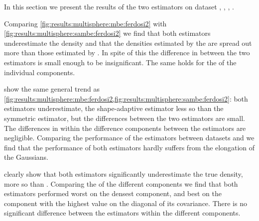 

















\oldStuff

	In this section we present the results of the two estimators on dataset \ferdosiTwo, \baakmanTwo, \ferdosiThree, \baakmanThree.

	Comparing \cref{fig:results:multisphere:mbe:ferdosi2} with \cref{fig:results:multisphere:sambe:ferdosi2} we find that both estimators underestimate the density and that the densities estimated by the \sambe are spread out more than those estimated by \mbe. In spite of this the difference in \mse between the two estimators is small enough to be insignificant. 
	The same holds for the \mse of the individual components.

	 show the same general trend as \cref{fig:results:multisphere:mbe:ferdosi2,fig:results:multisphere:sambe:ferdosi2}: both estimators underestimate, the shape-adaptive estimator less so than the symmetric estimator, but the differences between the two estimators are small. 
	The differences in \MSE within the difference components between the estimators are negligible. 
	Comparing the performance of the estimators between datasets \ferdosiTwo and \baakmanTwo we find that the performance of both estimators hardly suffers from the elongation of the Gaussians. 

	 clearly show that both estimators significantly underestimate the true density, \sambe more so than \mbe. 
	Comparing the \mse of the different components we find that both estimators performed worst on the densest component, and best on the component with the highest value on the diagonal of its covariance. There is no significant difference between the estimators within the different components. 

